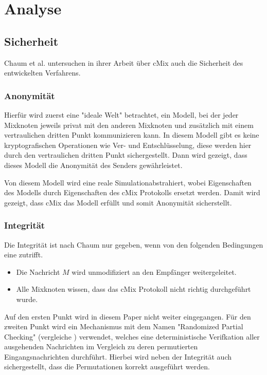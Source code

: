 \documentclass[
    fontsize=12pt,
    headings=small,
    parskip=half,           %
    bibliography=totoc,
    numbers=noenddot,       %
    open=any,               %
    ]{scrreprt}
\begin{document}
\section{Analyse}


\subsection{Sicherheit}

Chaum et al. untersuchen in ihrer Arbeit über cMix auch die Sicherheit des entwickelten Verfahrens.

\subsubsection{Anonymität}

Hierfür wird zuerst eine "ideale Welt" betrachtet, ein Modell, bei der jeder Mixknoten jeweils privat mit den anderen Mixknoten und zusätzlich mit einem vertraulichen dritten Punkt kommunizieren kann.
In diesem Modell gibt es keine kryptografischen Operationen wie Ver- und Entschlüsselung, diese werden hier durch den vertraulichen dritten Punkt sichergestellt.
Dann wird gezeigt, dass dieses Modell die Anonymität des Senders gewährleistet.

Von diesem Modell wird eine \glqq reale Simulation\grqq abstrahiert, wobei Eigenschaften des Modells durch Eigenschaften des cMix Protokolls ersetzt werden.
Damit wird gezeigt, dass cMix das Modell erfüllt und somit Anonymität sicherstellt.

\subsubsection{Integrität}

Die Integrität ist nach Chaum nur gegeben, wenn von den folgenden Bedingungen eine zutrifft.
\begin{itemize}
\item Die Nachricht $M$ wird unmodifiziert an den Empfänger weitergeleitet.
\item Alle Mixknoten wissen, dass das cMix Protokoll nicht richtig durchgeführt wurde.
\end{itemize}

Auf den ersten Punkt wird in diesem Paper nicht weiter eingegangen.
Für den zweiten Punkt wird ein Mechanismus mit dem Namen "Randomized Partial Checking" (vergleiche \cite{jakobsson2002making}) verwendet, welches eine deterministische Verifkation aller ausgehenden Nachrichten im Vergleich zu deren permutierten Eingangsnachrichten durchführt. 
Hierbei wird neben der Integrität auch sichergestellt, dass die Permutationen korrekt ausgeführt werden.
\end{document}
